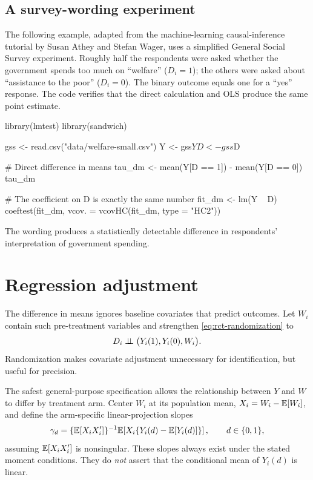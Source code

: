 \subsection{A survey-wording experiment}
\label{sec:rct-gss}

The following example, adapted from the machine-learning causal-inference tutorial
by Susan Athey and Stefan Wager, uses a simplified General Social Survey experiment.
Roughly half the respondents were asked whether the government spends too much on
``welfare'' ($D_i=1$); the others were asked about ``assistance to the poor''
($D_i=0$).  The binary outcome equals one for a ``yes'' response.  The code verifies
that the direct calculation and OLS produce the same point estimate.

\begin{rcode}
library(lmtest)
library(sandwich)

gss <- read.csv("data/welfare-small.csv")
Y <- gss$Y
D <- gss$D

# Direct difference in means
tau_dm <- mean(Y[D == 1]) - mean(Y[D == 0])
tau_dm

# The coefficient on D is exactly the same number
fit_dm <- lm(Y ~ D)
coeftest(fit_dm, vcov. = vcovHC(fit_dm, type = "HC2"))
\end{rcode}

The wording produces a statistically detectable difference in respondents'
interpretation of government spending.

\section{Regression adjustment}
\label{sec:rct-reg-adjustment}

The difference in means ignores baseline covariates that predict outcomes.  Let
$W_i$ contain such pre-treatment variables and strengthen
\eqref{eq:rct-randomization} to
\begin{equation}
  D_i\mathrel{\perp\!\!\!\perp}\bigl(Y_i(1),Y_i(0),W_i\bigr).
  \label{eq:rct-randomization-w}
\end{equation}
Randomization makes covariate adjustment unnecessary for identification, but useful
for precision.

The safest general-purpose specification allows the relationship between $Y$ and
$W$ to differ by treatment arm.  Center $W_i$ at its population mean,
$X_i=W_i-\mathbb{E}[W_i]$, and define the arm-specific linear-projection slopes
\begin{equation}
  \gamma_d
  =\{\mathbb{E}[X_iX_i']\}^{-1}\mathbb{E}\!\left[X_i\{Y_i(d)-\mathbb{E}[Y_i(d)]\}\right],
  \qquad d\in\{0,1\},
  \label{eq:rct-arm-slopes}
\end{equation}
assuming $\mathbb{E}[X_iX_i']$ is nonsingular.  These slopes always exist under the stated
moment conditions.  They do \emph{not} assert that the conditional mean of
$Y_i(d)$ is linear.

